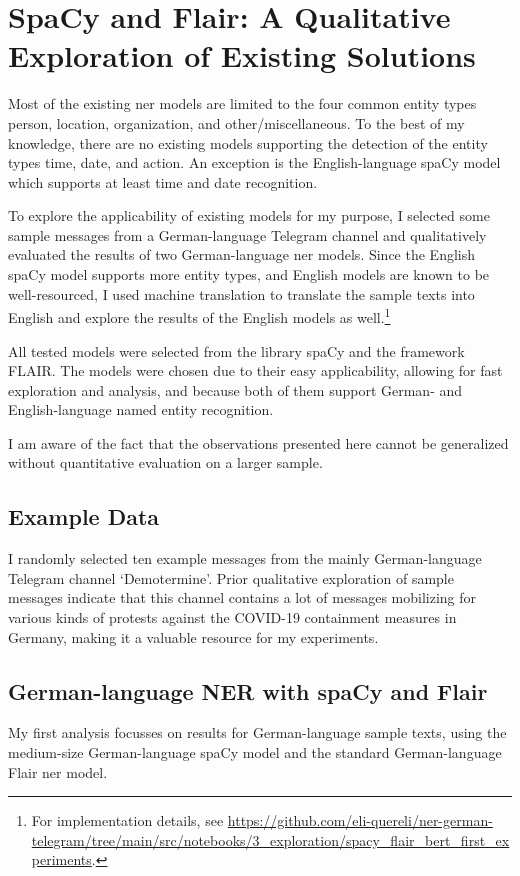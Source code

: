 \chapter{SpaCy and Flair: A Qualitative Exploration of Existing Solutions}
\label{cha:exploration}

Most of the existing \gls{ner} models are limited to the four common entity types person, location, organization, and other/miscellaneous. To the best of my knowledge, there are no existing models supporting the detection of the entity types time, date, and action. An exception is the English-language spaCy model which supports at least time and date recognition. 

To explore the applicability of existing models for my purpose, I selected some sample messages from a German-language Telegram channel and qualitatively evaluated the results of two German-language \gls{ner} models. 
Since the English spaCy model supports more entity types, and English models are known to be well-resourced, I used machine translation to translate the sample texts into English and explore the results of the English models as well.\footnote{For implementation details, see \url{https://github.com/eli-quereli/ner-german-telegram/tree/main/src/notebooks/3_exploration/spacy_flair_bert_first_experiments}.}

All tested models were selected from the library spaCy and the framework FLAIR. The models were chosen due to their easy applicability, allowing for fast exploration and analysis, and because both of them support German- and English-language named entity recognition.

I am aware of the fact that the observations presented here cannot be generalized without quantitative evaluation on a larger sample. 

\section{Example Data}
I randomly selected ten example messages from the mainly German-language Telegram channel `Demotermine'. Prior qualitative exploration of sample messages indicate that this channel contains a lot of messages mobilizing for various kinds of protests against the COVID-19 containment measures in Germany, making it a valuable resource for my experiments.

\section{German-language NER with spaCy and Flair}
My first analysis focusses on results for German-language sample texts, using the medium-size German-language spaCy model and the standard German-language Flair \gls{ner} model. 

